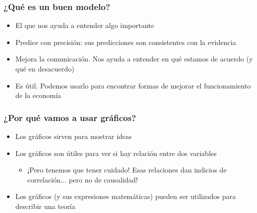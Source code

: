 \documentclass{beamer}
\begin{document}
\begin{frame}
\frametitle{¿Qué es un buen modelo?}
\begin{itemize}
    \item El que nos ayuda a entender algo importante
    \item Predice con precisión: sus predicciones son consistentes con la evidencia \vspace{1mm}
    \item Mejora la comunicación. Nos ayuda a entender en qué estamos de acuerdo (y qué en desacuerdo) \vspace{1mm}
    \item Es útil. Podemos usarlo para encontrar formas de mejorar el funcionamiento de la economía
\end{itemize} 
\end{frame}


\begin{frame}
\frametitle{¿Por qué vamos a usar gráficos?}
\begin{itemize}
    \item Los gráficos sirven para mostrar ideas \vspace{2mm}
    \item Los gráficos son útiles para ver si hay relación entre dos variables 
     \begin{itemize}
        \item ¡Pero tenemos que tener cuidado! Esas relaciones dan indicios de correlación... pero no de causalidad! \vspace{2mm}
    \end{itemize}
    \item Los gráficos (y sus expresiones matemáticas) pueden ser utilizados para describir una teoría
\end{itemize} 
\end{frame}
\end{document}
